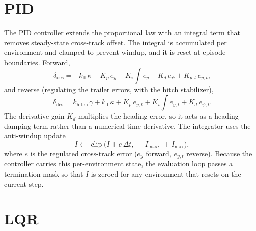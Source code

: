 \section{PID}
\label{sec:app_cc_pid}

The PID controller extends the proportional law with an integral term that removes
steady-state cross-track offset. The integral is accumulated per environment and clamped
to prevent windup, and it is reset at episode boundaries. Forward,
\begin{equation}
    \delta_{\mathrm{des}} = -k_{\mathrm{ff}}\,\kappa - K_p\, e_y
    - K_i \!\int\! e_y - K_d\, e_\psi + K_{p,t}\, e_{y,t},
    \label{eq:app_cc_pid_fwd}
\end{equation}
and reverse (regulating the trailer errors, with the hitch stabilizer),
\begin{equation}
    \delta_{\mathrm{des}} = k_{\mathrm{hitch}}\,\gamma + k_{\mathrm{ff}}\,\kappa
    + K_p\, e_{y,t} + K_i \!\int\! e_{y,t} + K_d\, e_{\psi,t}.
    \label{eq:app_cc_pid_rev}
\end{equation}
The derivative gain $K_d$ multiplies the heading error, so it acts as a heading-damping
term rather than a numerical time derivative. The integrator uses the anti-windup update
\begin{equation}
    I \leftarrow \operatorname{clip}\!\bigl(I + e\,\Delta t,\ -I_{\max},\ +I_{\max}\bigr),
    \label{eq:app_cc_pid_int}
\end{equation}
where $e$ is the regulated cross-track error ($e_y$ forward, $e_{y,t}$ reverse). Because
the controller carries this per-environment state, the evaluation loop passes a
termination mask so that $I$ is zeroed for any environment that resets on the current
step.

\section{LQR}
\label{sec:app_cc_lqr}

